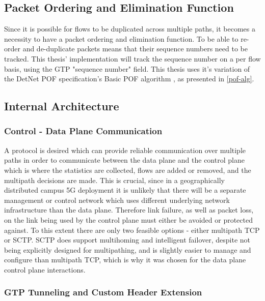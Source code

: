 \subsection{Packet Ordering and Elimination Function}

Since it is possible for flows to be duplicated across multiple paths, it becomes a necessity to have a packet ordering and elimination function. To be able to re-order and de-duplicate packets means that their sequence numbers need to be tracked. This thesis' implementation will track the sequence number on a per flow basis, using the GTP "sequence number" field. This thesis uses it's variation of the DetNet POF specification's Basic POF algorithm \cite{detnet-pof}, as presented in \ref{pof-alg}.

\subsection{Internal Architecture}

\subsubsection{Control - Data Plane Communication}

A protocol is desired which can provide reliable communication over multiple paths in order to communicate between the data plane and the control plane which is where the statistics are collected, flows are added or removed, and the multipath decisions are made. This is crucial, since in a geographically distributed campus 5G deployment it is unlikely that there will be a separate management or control network which uses different underlying network infrastructure than the data plane. Therefore link failure, as well as packet loss, on the link being used by the control plane must either be avoided or protected against. To this extent there are only two feasible options - either multipath TCP or SCTP. SCTP does support multihoming and intelligent failover, despite not being explicitly designed for multipathing, and is slightly easier to manage and configure than multipath TCP, which is why it was chosen for the data plane control plane interactions.

\subsubsection{GTP Tunneling and Custom Header Extension}

